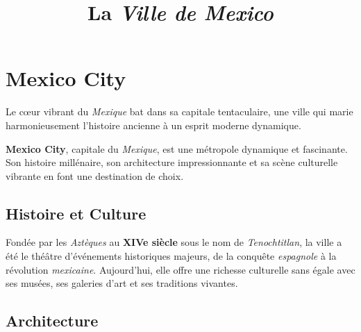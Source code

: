 \documentclass[12pt, a4paper]{article}
\title{La \textit{Ville de Mexico}}
\author{}
\date{}
\begin{document}
\maketitle

\section{\textbf{Mexico City}}

Le cœur vibrant du \textit{Mexique} bat dans sa capitale tentaculaire, une ville qui marie harmonieusement l'histoire ancienne à un esprit moderne dynamique.

\textbf{Mexico City}, capitale du \textit{Mexique}, est une métropole dynamique et fascinante. Son histoire millénaire, son architecture impressionnante et sa scène culturelle vibrante en font une destination de choix.

\subsection*{\textbf{Histoire et Culture}}

Fondée par les \textit{Aztèques} au \textbf{XIVe siècle} sous le nom de \textit{Tenochtitlan}, la ville a été le théâtre d'événements historiques majeurs, de la conquête \textit{espagnole} à la révolution \textit{mexicaine}. Aujourd'hui, elle offre une richesse culturelle sans égale avec ses musées, ses galeries d'art et ses traditions vivantes.

\subsection*{\textbf{Architecture}}
\end{document}
